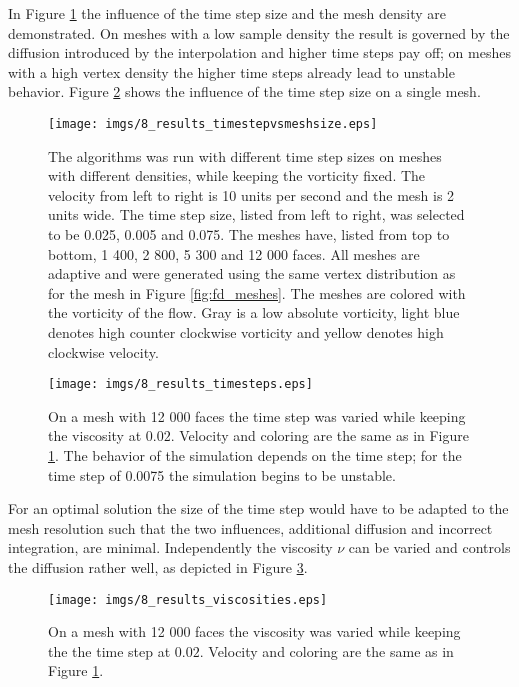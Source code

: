 In Figure \ref{fig:fd_timevsmesh} the influence of the time step size and the mesh density are demonstrated. On meshes with a low sample density the result is governed by the diffusion introduced by the interpolation and higher time steps pay off; on meshes with a high vertex density the higher time steps already lead to unstable behavior. Figure \ref{fig:fd_timesteps} shows the influence of the time step size on a single mesh.


\begin{figure}%
\texttt{[image: imgs/8\_results\_timestepvsmeshsize.eps]}%
\caption{The algorithms was run with different time step sizes on meshes with different densities, while keeping the vorticity fixed. The velocity from left to right is 10 units per second and the mesh is 2 units wide. The time step size, listed from left to right, was selected to be 0.025, 0.005 and 0.075. The meshes have, listed from top to bottom, 1 400, 2 800, 5 300 and 12 000 faces. All meshes are adaptive and were generated using the same vertex distribution as for the mesh in Figure \ref{fig:fd_meshes}.
The meshes are colored with the vorticity of the flow. Gray is a low absolute vorticity, light blue denotes high counter clockwise vorticity and yellow denotes high clockwise velocity.
}%
\label{fig:fd_timevsmesh}%
\end{figure}

\begin{figure}%
\texttt{[image: imgs/8\_results\_timesteps.eps]}%
\caption{On a mesh with 12 000 faces the time step was varied while keeping the viscosity at $0.02$. Velocity and coloring are the same as in Figure \ref{fig:fd_timevsmesh}. The behavior of the simulation depends on the time step; for the time step of 0.0075 the simulation begins to be unstable.}%
\label{fig:fd_timesteps}%
\end{figure}

For an optimal solution the size of the time step would have to be adapted to the mesh resolution such that the two influences, additional diffusion and incorrect integration, are minimal.
Independently the viscosity $\nu$ can be varied and controls the diffusion rather well, as depicted in Figure \ref{fig:fd_viscosities}.

\begin{figure}%
\texttt{[image: imgs/8\_results\_viscosities.eps]}%
\caption{On a mesh with 12 000 faces the viscosity was varied while keeping the the time step at $0.02$. Velocity and coloring are the same as in Figure \ref{fig:fd_timevsmesh}.}%
\label{fig:fd_viscosities}%
\end{figure}

